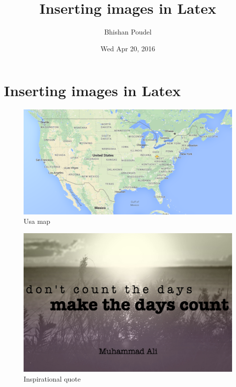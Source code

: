 \documentclass[11pt,a4paper,english]{article}
\title{Inserting images in Latex}
\author{Bhishan Poudel}
\date{Wed Apr 20, 2016}
\begin{document}
\maketitle
\tableofcontents
\listoffigures
\clearpage

\section{Inserting images in Latex}
\begin{figure}[ht!]
\centering
\includegraphics[scale=0.5]{images/a.png}
\caption{Usa map}
\label{fig:usa_map}   
\end{figure}
\begin{figure}[ht!]
\centering
\includegraphics[scale=0.3]{images/a.jpg}
\caption{Inspirational quote}
\label{fig:make_the_day}   
\end{figure}
\clearpage
\end{document}
